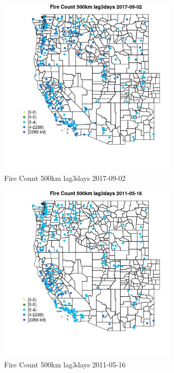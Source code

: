 \begin{figure} 
\centering  
\includegraphics[width=0.77\textwidth]{Code_Outputs/Report_ML_input_PM25_Step4_part_e_de_duplicated_aves_compiled_2019-05-20wNAs_MapObsFire_Count_500km_lag3days2017-09-02.jpg} 
\caption{\label{fig:Report_ML_input_PM25_Step4_part_e_de_duplicated_aves_compiled_2019-05-20wNAsMapObsFire_Count_500km_lag3days2017-09-02}Fire Count 500km lag3days 2017-09-02} 
\end{figure} 
 

\clearpage 

\begin{figure} 
\centering  
\includegraphics[width=0.77\textwidth]{Code_Outputs/Report_ML_input_PM25_Step4_part_e_de_duplicated_aves_compiled_2019-05-20wNAs_MapObsFire_Count_500km_lag3days2011-05-16.jpg} 
\caption{\label{fig:Report_ML_input_PM25_Step4_part_e_de_duplicated_aves_compiled_2019-05-20wNAsMapObsFire_Count_500km_lag3days2011-05-16}Fire Count 500km lag3days 2011-05-16} 
\end{figure} 
 

